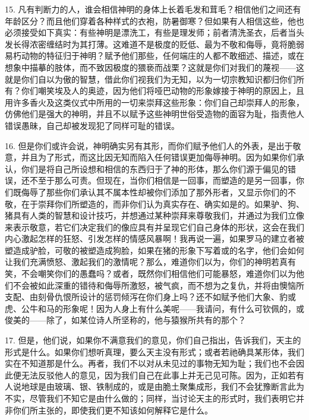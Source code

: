 15. 凡有判断力的人，谁会相信神明的身体上长着毛发和茸毛？相信他们之间还有年龄区分？而且他们穿着各种样式的衣袍，防暑御寒？但如果有人相信这些，他也必须接受如下真实：有些神明是漂洗工，有些是理发师；前者清洗圣衣，后者当头发长得浓密缠结时为其打薄。这难道不是极度的贬低、最为不敬和侮辱，竟将脆弱易朽动物的特征归于神明？赋予他们那些，任何端庄的人都不敢细述、描述，或在想象中描摹的肢体，而不致因极度的猥亵而战栗？这就是你们对我们的蔑视——这就是你们自以为傲的智慧，借此你们视我们为无知，以为一切宗教知识都归你们所有？你们嘲笑埃及人的奥迹，因为他们将哑巴动物的形象嫁接于神明的原因上，且用许多香火及这类仪式中所用的一切来崇拜这些形象：你们自己却崇拜人的形象，仿佛他们是强大的神明，并且不以赋予这些神明世俗受造物的面容为耻，指责他人错误愚昧，自己却被发现犯了同样可耻的错误。\par

16. 但是你们或许会说，神明确实另有其形，而你们赋予他们人的外表，是出于敬意，并且为了形式，而这比因无知而陷入任何错误更加侮辱神明。因为如果你们承认，你们是将自己所设想和相信的东西归于了神的形体，那么你们源于偏见的错误，还不至于那么可责。但现在，当你们相信是一回事，而塑造的是另一回事，你们既侮辱了那些你们承认其不属本性却被你们添加了那外形者，又显示你们的不敬，在于崇拜你们所塑造的，而非你们认为真实存在、确实如是的。如果驴、狗、猪具有人类的智慧和设计技巧，并想通过某种崇拜来尊敬我们，并通过为我们立像来表示敬意，若它们决定我们的像应具有并呈现它们自己身体的形状，这会在我们内心激起怎样的狂怒、引发怎样的情感风暴啊！我再说一遍，如果罗马的建立者被塑造成驴脸，可敬的被塑造成狗脸，如果在猪的形象下写着或的名字，他们会如何让我们充满愤怒、激起我们的激情呢？那么，难道你们以为，你们的神明若真有笑，不会嘲笑你们的愚蠢吗？或者，既然你们相信他们可能暴怒，难道你们以为他们不会被如此深重的错待和侮辱所激怒，被气疯，而不想为之复仇，并将由懊恼所支配、由刻骨仇恨所设计的惩罚倾泻在你们身上吗？还不如赋予他们大象、豹或虎、公牛和马的形象呢！因为人身上有什么美呢——我请问，有什么可钦佩的，或俊美的——除了，如某位诗人所坚称的，他与猿猴所共有的那个？\par

17. 但是，他们说，如果你不满意我们的意见，你们自己指出，告诉我们，天主的形式是什么。如果你们想听真理，要么天主没有形式；或者若祂确具某形体，我们实在不知道那是什么。再者，我们不以对从未见过的事物无知为耻；我们也不会因此便无法反驳他人的意见，因为我们自己在此事上并无己见可陈。因为，正如若有人说地球是由玻璃、银、铁制成的，或是由脆土聚集成形，我们不会犹豫断言此为不实，尽管我们不知它是由什么做的；同样，当讨论天主的形式时，我们表明它并非你们所主张的，即使我们更不知该如何解释它是什么。\par

